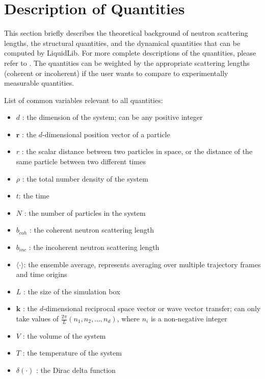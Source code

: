 \documentclass{article}
\begin{document}
\section{Description of Quantities}  
This section briefly describes the theoretical background of neutron scattering lengths, the structural quantities, and the dynamical quantities that can be computed by LiquidLib. For more complete descriptions of the quantities, please refer to \cite{EGELSTAFF, Hansen}. The quantities can be weighted by the appropriate scattering lengths (coherent or incoherent) if the user wants to compare to experimentally measurable quantities.

List of common variables relevant to all quantities:
\begin{itemize}[noitemsep]
	\item $d$ : the dimension of the system; can be any positive integer
	\item $\mathbf{r}$ : the $d$-dimensional position vector of a particle 
	\item $r$ : the scalar distance between two particles in space, or the distance of the same particle between two different times
	\item $\rho$ : the total number density of the system
	\item $t$: the time
	\item $N$ : the number of particles in the system
	\item $b_{coh}$ : the coherent neutron scattering length
	\item $b_{inc}$ : the incoherent neutron scattering length
	\item $\langle \cdot \rangle$: the ensemble average, represents averaging over multiple trajectory frames and time origins
	\item $L$ : the size of the simulation box
	\item $\mathbf{k}$ : the $d$-dimensional reciprocal space vector or wave vector transfer; can only take values of $\frac{2\pi}{L}(n_1,n_2, ... ,n_d)$, where $n_i$ is a non-negative integer
	\item $V$ : the volume of the system
	\item $T$ : the temperature of the system
	\item $\delta(\cdot)$ : the Dirac delta function
\end{itemize} 
\end{document}
